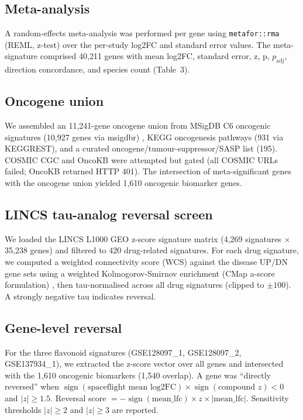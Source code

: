 \documentclass[pdflatex,sn-nature]{sn-jnl}
\begin{document}
\subsection{Meta-analysis}
A random-effects meta-analysis was performed per gene using \texttt{metafor::rma}
(REML, z-test) \cite{viechtbauer2010} over the per-study log2FC and standard error
values. The meta-signature comprised 40{,}211 genes with mean log2FC, standard
error, z, p, \(p_{\mathrm{adj}}\), direction concordance, and species count
(Table~3).

\subsection{Oncogene union}
We assembled an 11{,}241-gene oncogene union from MSigDB C6 oncogenic signatures
(10{,}927 genes via msigdbr) \cite{liberzon2015}, KEGG oncogenesis pathways (931 via
KEGGREST), and a curated oncogene/tumour-suppressor/SASP list (195). COSMIC CGC and
OncoKB were attempted but gated (all COSMIC URLs failed; OncoKB returned HTTP 401).
The intersection of meta-significant genes with the oncogene union yielded 1{,}610
oncogenic biomarker genes.

\subsection{LINCS tau-analog reversal screen}
We loaded the LINCS L1000 GEO z-score signature matrix (4{,}269 signatures \(\times\)
35{,}238 genes) and filtered to 420 drug-related signatures. For each drug
signature, we computed a weighted connectivity score (WCS) against the disease
UP/DN gene sets using a weighted Kolmogorov-Smirnov enrichment (CMap a-score
formulation) \cite{lamb2006,subramanian2017}, then tau-normalised across all drug
signatures (clipped to \(\pm 100\)). A strongly negative tau indicates reversal.

\subsection{Gene-level reversal}
For the three flavonoid signatures (GSE128097\_1, GSE128097\_2, GSE137934\_1), we
extracted the z-score vector over all genes and intersected with the 1{,}610
oncogenic biomarkers (1{,}540 overlap). A gene was ``directly reversed'' when
\(\operatorname{sign}(\text{spaceflight mean log2FC}) \times \operatorname{sign}
(\text{compound } z) < 0\) and \(|z| \geq 1.5\). Reversal score \(=
-\operatorname{sign}(\text{mean\_lfc}) \times z \times |\text{mean\_lfc}|\).
Sensitivity thresholds \(|z| \geq 2\) and \(|z| \geq 3\) are reported.
\end{document}
